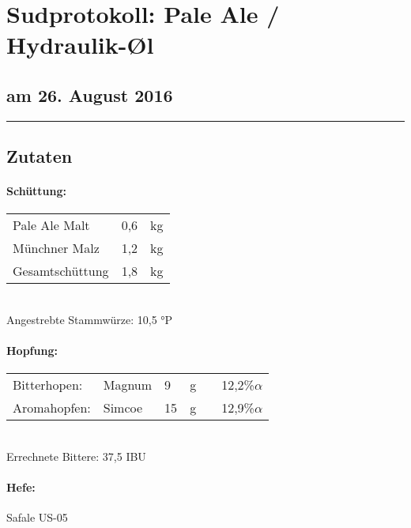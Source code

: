 \documentclass[12pt,oneside,a4paper]{scrartcl}
\begin{document}
	\begin{minipage}[c]{0.70\textwidth}
		\section*{\hspace{-.4cm}Sudprotokoll: Pale Ale / Hydraulik-\O{}l}
	\end{minipage}
	\begin{minipage}[c]{0.29\textwidth}
		\subsection*{am 26. August 2016}
	\end{minipage}
	\rule{\textwidth}{1pt}
%
\subsection*{Zutaten}
%
\paragraph{Schüttung:}
	\begin{tabular}[t]{m{8cm} m{2cm} m{1cm}}
		Pale Ale Malt & 0,6 & kg \bigstrut\\
		Münchner Malz & 1,2 & kg \bigstrut\\\hline
		Gesamtschüttung & 1,8 & kg\bigstrut
	\end{tabular}\\

\vspace{.25cm}
\hspace{1cm}Angestrebte Stammwürze: 10,5 °P
%
\paragraph{Hopfung:}
	\begin{tabular}[t]{m{2.5cm} m{5cm} m{0.5cm} m{1cm} m{0.5cm} m{1cm}}
		Bitterhopen: & Magnum & 9 & g &  & 12,2\%$\alpha$ \\%
		Aromahopfen: & Simcoe & 15 & g &  & 12,9\%$\alpha$%
	\end{tabular}\\

\vspace{.25cm}
\hspace{1cm}Errechnete Bittere: 37,5 IBU
%
\paragraph{Hefe:}
	Safale US-05
\end{document}
